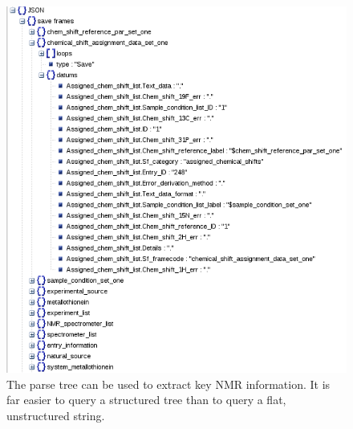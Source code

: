 \begin{figure}
  \includegraphics[scale=0.5]{figures/nmrpystar_structure}
  \caption[The parse tree can be used to extract key NMR information.]
          {The parse tree can be used to extract key NMR information.
           It is far easier to query a structured tree than to query
           a flat, unstructured string.}
  \label{nmrpystar_structure}
\end{figure}

